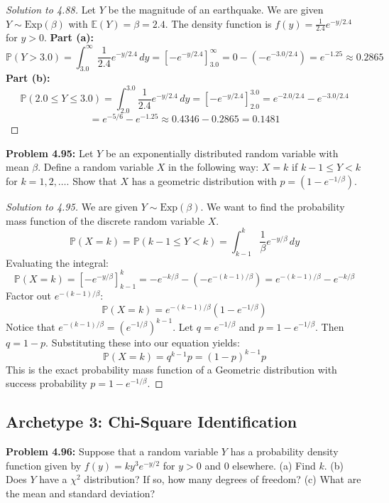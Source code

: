 \documentclass[11pt, a4paper]{article}
\theoremstyle{definition}
\theoremstyle{remark}
\newcommand{\E}{\mathbb{E}}
\newcommand{\Prob}{\mathbb{P}}
\begin{document}
\begin{proof}[Solution to 4.88]
Let $Y$ be the magnitude of an earthquake. We are given $Y \sim \text{Exp}(\beta)$ with $\E(Y) = \beta = 2.4$.
The density function is $f(y) = \frac{1}{2.4}e^{-y/2.4}$ for $y > 0$.
\textbf{Part (a):}
\[ \Prob(Y > 3.0) = \int_{3.0}^\infty \frac{1}{2.4}e^{-y/2.4} \, dy = \left[ -e^{-y/2.4} \right]_{3.0}^\infty = 0 - (-e^{-3.0/2.4}) = e^{-1.25} \approx 0.2865 \]
\textbf{Part (b):}
\[ \Prob(2.0 \le Y \le 3.0) = \int_{2.0}^{3.0} \frac{1}{2.4}e^{-y/2.4} \, dy = \left[ -e^{-y/2.4} \right]_{2.0}^{3.0} = e^{-2.0/2.4} - e^{-3.0/2.4} \]
\[ = e^{-5/6} - e^{-1.25} \approx 0.4346 - 0.2865 = 0.1481 \]
\end{proof}

\textbf{Problem 4.95:} Let $Y$ be an exponentially distributed random variable with mean $\beta$. Define a random variable $X$ in the following way: $X = k$ if $k-1 \le Y < k$ for $k = 1, 2, \dots$. Show that $X$ has a geometric distribution with $p = (1 - e^{-1/\beta})$.

\begin{proof}[Solution to 4.95]
We are given $Y \sim \text{Exp}(\beta)$. We want to find the probability mass function of the discrete random variable $X$.
\[ \Prob(X = k) = \Prob(k-1 \le Y < k) = \int_{k-1}^k \frac{1}{\beta}e^{-y/\beta} \, dy \]
Evaluating the integral:
\[ \Prob(X = k) = \left[ -e^{-y/\beta} \right]_{k-1}^k = -e^{-k/\beta} - (-e^{-(k-1)/\beta}) = e^{-(k-1)/\beta} - e^{-k/\beta} \]
Factor out $e^{-(k-1)/\beta}$:
\[ \Prob(X = k) = e^{-(k-1)/\beta} \left( 1 - e^{-1/\beta} \right) \]
Notice that $e^{-(k-1)/\beta} = (e^{-1/\beta})^{k-1}$. Let $q = e^{-1/\beta}$ and $p = 1 - e^{-1/\beta}$. Then $q = 1 - p$.
Substituting these into our equation yields:
\[ \Prob(X = k) = q^{k-1} p = (1-p)^{k-1} p \]
This is the exact probability mass function of a Geometric distribution with success probability $p = 1 - e^{-1/\beta}$.
\end{proof}

\subsection{Archetype 3: Chi-Square Identification}

\textbf{Problem 4.96:} Suppose that a random variable $Y$ has a probability density function given by $f(y) = k y^3 e^{-y/2}$ for $y > 0$ and $0$ elsewhere. (a) Find $k$. (b) Does $Y$ have a $\chi^2$ distribution? If so, how many degrees of freedom? (c) What are the mean and standard deviation?
\end{document}
